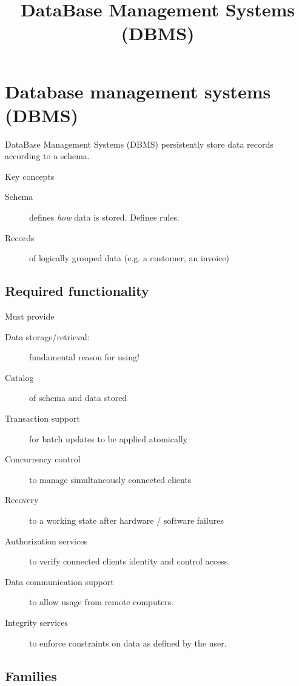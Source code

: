 \documentclass[slides]{pgnotes}
\title{DataBase Management Systems (DBMS)}
\begin{document}
\maketitle

\tableofcontents

\section{Database management systems (DBMS)}\label{sec:dbms}

DataBase Management Systems (DBMS) persistently store data records according to a schema.

\begin{bluebox}{Key concepts}
\begin{description}
\item[Schema] defines \textit{how} data is stored. Defines rules.
\item[Records] of logically grouped data (e.g. a customer, an invoice)
\end{description}
\end{bluebox}

\subsection{Required functionality}

\begin{greenbox}{Must provide}
\begin{description}
\item[Data storage/retrieval:] fundamental reason for using! 
\item[Catalog] of schema and data stored
\item[Transaction support] for batch updates to be applied atomically
\item[Concurrency control] to manage simultaneously connected clients
\item[Recovery] to a working state after hardware / software failures
\item[Authorization services] to verify connected clients identity and control access.
\item[Data communication support] to allow usage from remote computers.
\item[Integrity services] to enforce constraints on data as defined by the user.
\end{description}
\end{greenbox}

\subsection{Families}
\end{document}
